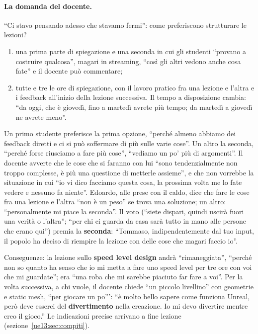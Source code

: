 \paragraph{La domanda del docente.} ``Ci stavo pensando adesso che stavamo fermi'': come
preferiscono strutturare le lezioni?
\begin{enumerate}
  \item una prima parte di spiegazione e una seconda in cui gli studenti ``provano a
        costruire qualcosa'', magari in streaming, ``così gli altri vedono anche cosa
        fate'' e il docente può commentare;
  \item tutte e tre le ore di spiegazione, con il lavoro pratico fra una lezione e l'altra
        e i feedback all'inizio della lezione successiva. Il tempo a disposizione cambia:
        ``da oggi, che è giovedì, fino a martedì avrete più tempo; da martedì a giovedì ne
        avrete meno''.
\end{enumerate}
Un primo studente preferisce la prima opzione, ``perché almeno abbiamo dei feedback diretti
e ci si può soffermare di più sulle varie cose''. Un altro la seconda, ``perché forse
riusciamo a fare più cose'', ``vediamo un po' più di argomenti''. Il docente avverte che le
cose che si faranno con lui ``sono tendenzialmente non troppo complesse, è più una
questione di metterle assieme'', e che non vorrebbe la situazione in cui ``io vi dico
facciamo questa cosa, la prossima volta me lo fate vedere e nessuno fa niente''. Edoardo,
alle prese con il caldo, dice che fare le cose fra una lezione e l'altra ``non è un peso''
se trova una soluzione; un altro: ``personalmente mi piace la seconda''. Il voto (``siete
dispari, quindi uscirà fuori una verità o l'altra''; ``per chi ci guarda da casa sarà tutto
in mano alle persone che erano qui'') premia la \textbf{seconda}: ``Tommaso, indipendentemente
dal tuo input, il popolo ha deciso di riempire la lezione con delle cose che magari faccio
io''.

Conseguenze: la lezione sullo \textbf{speed level design} andrà ``rimaneggiata'', ``perché
non so quanto ha senso che io mi metta a fare uno speed level per tre ore con voi che mi
guardate''; era ``una roba che mi sarebbe piaciuto far fare a voi''. Per la volta successiva,
a chi vuole, il docente chiede ``un piccolo livellino'' con geometrie e static mesh, ``per
giocare un po''': ``è molto bello sapere come funziona Unreal, però deve esserci del
\textbf{divertimento} nella creazione. Io mi devo divertire mentre creo il gioco.'' Le
indicazioni precise arrivano a fine lezione (sezione~\ref{ue13:sec:compiti}).

